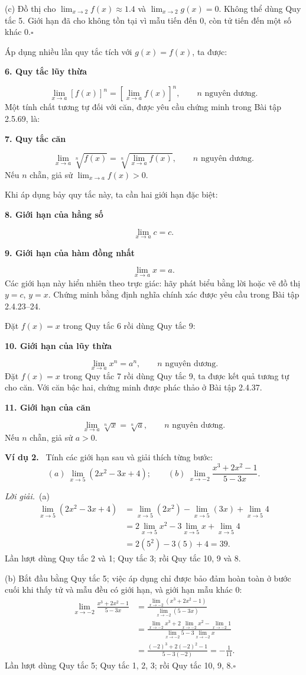 \documentclass[12pt,a4paper]{article}
\newcommand{\ex}[1]{\par\medskip\noindent\textbf{Ví dụ #1.}\ }
\newcommand{\sol}{\par\noindent\textit{Lời giải.}\ }
\newcommand{\group}[1]{\par\medskip\noindent\textbf{#1}\par}
\begin{document}
(c) Đồ thị cho $\lim_{x\to2}f(x)\approx1.4$ và $\lim_{x\to2}g(x)=0$. Không thể dùng Quy tắc 5. Giới hạn đã cho không tồn tại vì mẫu tiến đến 0, còn tử tiến đến một số khác 0.\hfill$\square$

Áp dụng nhiều lần quy tắc tích với $g(x)=f(x)$, ta được:
\group{6. Quy tắc lũy thừa}
\[\lim_{x\to a}[f(x)]^n=\left[\lim_{x\to a}f(x)\right]^n,\qquad n\text{ nguyên dương}.\]
Một tính chất tương tự đối với căn, được yêu cầu chứng minh trong Bài tập 2.5.69, là:
\group{7. Quy tắc căn}
\[\lim_{x\to a}\sqrt[n]{f(x)}=\sqrt[n]{\lim_{x\to a}f(x)},\qquad n\text{ nguyên dương}.\]
Nếu $n$ chẵn, giả sử $\lim_{x\to a}f(x)>0$.

Khi áp dụng bảy quy tắc này, ta cần hai giới hạn đặc biệt:
\group{8. Giới hạn của hằng số}
\[\lim_{x\to a}c=c.\]
\group{9. Giới hạn của hàm đồng nhất}
\[\lim_{x\to a}x=a.\]
Các giới hạn này hiển nhiên theo trực giác: hãy phát biểu bằng lời hoặc vẽ đồ thị $y=c$, $y=x$. Chứng minh bằng định nghĩa chính xác được yêu cầu trong Bài tập 2.4.23–24.

Đặt $f(x)=x$ trong Quy tắc 6 rồi dùng Quy tắc 9:
\group{10. Giới hạn của lũy thừa}
\[\lim_{x\to a}x^n=a^n,\qquad n\text{ nguyên dương}.\]
Đặt $f(x)=x$ trong Quy tắc 7 rồi dùng Quy tắc 9, ta được kết quả tương tự cho căn. Với căn bậc hai, chứng minh được phác thảo ở Bài tập 2.4.37.
\group{11. Giới hạn của căn}
\[\lim_{x\to a}\sqrt[n]{x}=\sqrt[n]{a},\qquad n\text{ nguyên dương}.\]
Nếu $n$ chẵn, giả sử $a>0$.
\ex{2} Tính các giới hạn sau và giải thích từng bước:
\[(a)\ \lim_{x\to5}(2x^2-3x+4);\qquad(b)\ \lim_{x\to-2}\frac{x^3+2x^2-1}{5-3x}.\]
\sol (a)
\begin{align*}
\lim_{x\to5}(2x^2-3x+4)&=\lim_{x\to5}(2x^2)-\lim_{x\to5}(3x)+\lim_{x\to5}4\\
&=2\lim_{x\to5}x^2-3\lim_{x\to5}x+\lim_{x\to5}4\\
&=2(5^2)-3(5)+4=39.
\end{align*}
Lần lượt dùng Quy tắc 2 và 1; Quy tắc 3; rồi Quy tắc 10, 9 và 8.

(b) Bắt đầu bằng Quy tắc 5; việc áp dụng chỉ được bảo đảm hoàn toàn ở bước cuối khi thấy tử và mẫu đều có giới hạn, và giới hạn mẫu khác 0:
\begin{align*}
\lim_{x\to-2}\frac{x^3+2x^2-1}{5-3x}
&=\frac{\lim_{x\to-2}(x^3+2x^2-1)}{\lim_{x\to-2}(5-3x)}\\
&=\frac{\lim_{x\to-2}x^3+2\lim_{x\to-2}x^2-\lim_{x\to-2}1}{\lim_{x\to-2}5-3\lim_{x\to-2}x}\\
&=\frac{(-2)^3+2(-2)^2-1}{5-3(-2)}=-\frac1{11}.
\end{align*}
Lần lượt dùng Quy tắc 5; Quy tắc 1, 2, 3; rồi Quy tắc 10, 9, 8.\hfill$\square$
\end{document}
